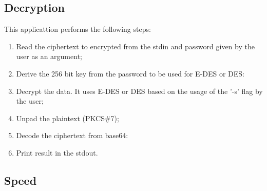 \documentclass{article} %
\begin{document}
\subsection{Decryption}
This applicattion performs the following steps:
\begin{enumerate}
  \item Read the ciphertext to encrypted from the stdin and password given by the user as an argument;
  \item Derive the 256 bit key from the password to be used for E-DES or DES:
  \item Decrypt the data. It uses E-DES or DES based on the usage of the '-s' flag by the user;
  \item Unpad the plaintext (PKCS\#7);
  \item Decode the ciphertext from base64:
  \item Print result in the stdout.
\end{enumerate}

\subsection{Speed}
\label{speed}
\end{document}
